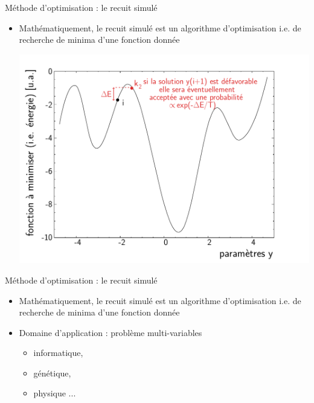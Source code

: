 \documentclass[t, compress]{beamer}
\begin{document}
\begin{frame}[c, fragile]{Méthode d'optimisation : le recuit simulé}

  \begin{itemize}

  \item Mathématiquement, le recuit simulé est un algorithme
    d'optimisation i.e. de recherche de minima d'une fonction donnée

    \begin{center}
      \includegraphics[scale=0.5]{figures/sam_3}
    \end{center}

  \end{itemize}

\end{frame}

\begin{frame}[c, fragile]{Méthode d'optimisation : le recuit simulé}

  \begin{itemize}

  \item Mathématiquement, le recuit simulé est un algorithme
    d'optimisation i.e. de recherche de minima d'une fonction donnée

  \item Domaine d'application : problème multi-variables

    \begin{itemize}

    \item informatique,
    \item génétique,
    \item physique ...

    \end{itemize}

  \end{itemize}

\end{frame}
\end{document}
